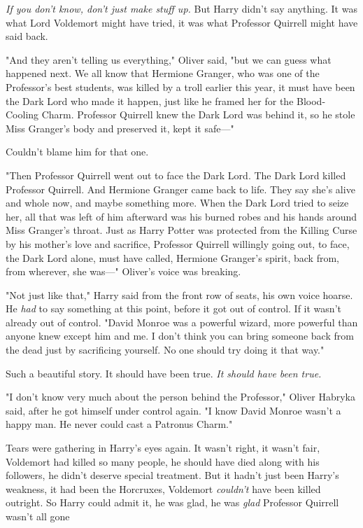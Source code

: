 \emph{If you don't know, don't just make stuff up.} But Harry didn't say
anything. It was what Lord Voldemort might have tried, it was what Professor
Quirrell might have said back.

"And they aren't telling us everything," Oliver said, "but we can guess what
happened next. We all know that Hermione Granger, who was one of the
Professor's best students, was killed by a troll earlier this year, it must
have been the Dark Lord who made it happen, just like he framed her for the
Blood-Cooling Charm. Professor Quirrell knew the Dark Lord was behind it, so he
stole Miss Granger's body and preserved it, kept it safe\mbox{---}"

Couldn't blame him for that one.

"Then Professor Quirrell went out to face the Dark Lord. The Dark Lord killed
Professor Quirrell. And Hermione Granger came back to life. They say she's
alive and whole now, and maybe something more. When the Dark Lord tried to
seize her, all that was left of him afterward was his burned robes and his
hands around Miss Granger's throat. Just as Harry Potter was protected from the
Killing Curse by his mother's love and sacrifice, Professor Quirrell willingly
going out, to face, the Dark Lord alone, must have called, Hermione Granger's
spirit, back from, from wherever, she was\mbox{---}" Oliver's voice was breaking.

"Not just like that," Harry said from the front row of seats, his own voice
hoarse. He \emph{had} to say something at this point, before it got out of
control. If it wasn't already out of control. "David Monroe was a powerful
wizard, more powerful than anyone knew except him and me. I don't think you can
bring someone back from the dead just by sacrificing yourself. No one should
try doing it that way."

Such a beautiful story. It should have been true. \emph{It should have been
true.}

"I don't know very much about the person behind the Professor," Oliver Habryka
said, after he got himself under control again. "I know David Monroe wasn't a
happy man. He never could cast a Patronus Charm."

Tears were gathering in Harry's eyes again. It wasn't right, it wasn't fair,
Voldemort had killed so many people, he should have died along with his
followers, he didn't deserve special treatment. But it hadn't just been Harry's
weakness, it had been the Horcruxes, Voldemort \emph{couldn't} have been killed
outright. So Harry could admit it, he was glad, he was \emph{glad} Professor
Quirrell wasn't all gone{\el}

